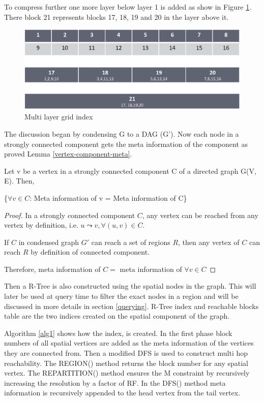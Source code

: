 To compress further one more layer below layer 1 is added as show in Figure \ref{fig:multi-grid2}. There block 21 represents blocks 17, 18, 19 and 20 in the layer above it. 

\begin{figure}[t]
    \centering
    \includegraphics[width=0.88\linewidth]{images/multi_layer_grid_index.eps}
    \caption{Multi layer grid index}
    \label{fig:multi-grid2}
\end{figure}

The discussion began by condensing G to a DAG (G'). Now each node in a strongly connected component gets the meta information of the component as proved Lemma \ref{vertex-component-meta}.

\begin{lemma}
\label{vertex-component-meta}
Let v be a vertex in a strongly connected component C of a directed graph G(V, E). Then,

{\{$\forall v \in C$: Meta information of v = Meta information of C\}}\\
\end{lemma}

\begin{proof}
In a strongly connected component $C$, any vertex can be reached from any vertex by definition, i.e. $u \leadsto v, \forall (u, v) \in C$. 

If $C$ in condensed graph $G'$ can reach a set of regions $R$, then any vertex of $C$ can reach $R$ by definition of connected component.

Therefore, meta information of $C =$ meta information of $\forall v \in C$
\end{proof}

Then a R-Tree is also constructed using the spatial nodes in the graph. This will later be used at query time to filter the exact nodes in a region and will be discussed in more details in section \ref{querying}. R-Tree index and reachable blocks table are the two indices created on the spatial component of the graph.

Algorithm \ref{alg1} shows how the index, {\rrpspatial} is created. In the first phase block numbers of all spatial vertices are added as the meta information of the vertices they are connected from. Then a modified DFS is used to construct multi hop reachability. The REGION() method returns the block number for any spatial vertex. The REPARTITION() method ensures the M constraint by recursively increasing the resolution by a factor of RF. In the DFS() method meta information is recursively appended to the head vertex from the tail vertex.

